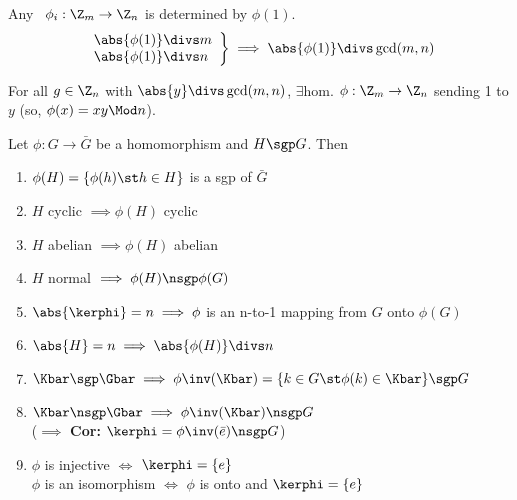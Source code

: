   \begin{example}
      Any \homo\ \(\phi_i: \Z_m\to\Z_n\) is determined by \(\phi(1)\).
       \begin{align*}
          \left.
             \begin{array}{l}
              \abs{\phi(1)} \divs m \\ \abs{\phi(1)} \divs n
          \end{array}
          \right\}\implies \abs{\phi(1)} \divs \gcd(m,n)
       \end{align*}
  \end{example}

  \begin{exercise}
    For all \(g\in\Z_n\) with \(\abs{y}\divs\gcd(m,n)\), $\exists$hom. \(\phi:\Z_m\to\Z_n\) sending 1 to \(y\) (so, \(\phi(x)=xy\Mod n\)).
  \end{exercise}

  \begin{theorem}
      Let \(\phi: G\to\bar G\) be a homomorphism and \(H\sgp G\). Then
      \begin{enumerate}
          \item \(\phi(H)=\{\phi(h)\st h\in H\}\) is a sgp of \(\bar G\)
          \item \(H\) cyclic \(\implies \phi(H)\) cyclic
          \item \(H\) abelian \(\implies \phi(H)\) abelian
          \item \(H\) normal \(\implies \phi(H) \nsgp \phi(G)\)
          \item \(\abs{\kerphi} = n \implies \phi\) is an n-to-1 mapping from \(G\) onto \(\phi(G)\)
          \item \(\abs{H} = n \implies \abs{\phi(H)} \divs n\)
          \item \(\Kbar \sgp \Gbar \implies \phi\inv(\Kbar)=\{k\in G\st \phi(k)\in\Kbar\}\sgp G\)
          \item \(\Kbar \nsgp \Gbar \implies \phi\inv(\Kbar) \nsgp G\) \\
          (\(\implies\) \textbf{Cor:} \(\kerphi = \phi\inv(\bar{e}) \nsgp G\))
          \item \(\phi\) is injective \(\iff\) \(\kerphi=\{e\}\) \\
          \(\phi\) is an isomorphism \(\iff\) \(\phi\) is onto and \(\kerphi=\{e\}\)
      \end{enumerate}
  \end{theorem}

